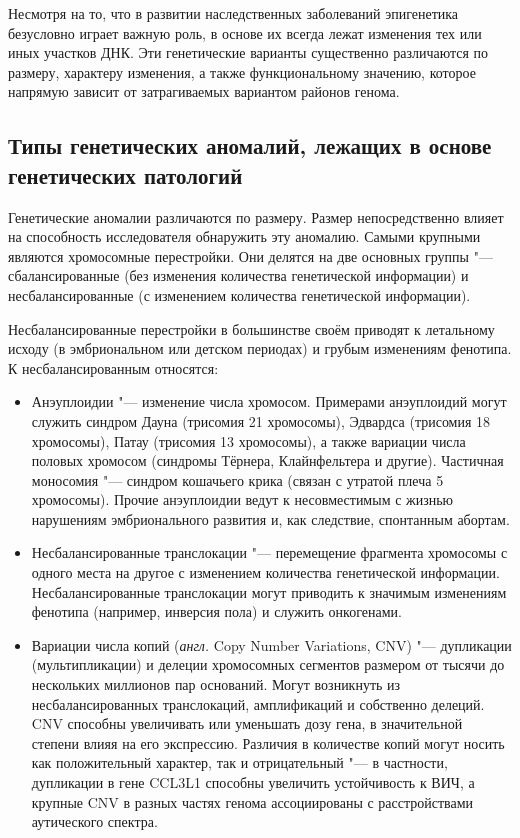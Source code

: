 \documentclass[a4paper,12pt]{article}
\begin{document}
Несмотря на то, что в развитии наследственных заболеваний эпигенетика безусловно играет важную роль, в основе их всегда лежат изменения тех или иных участков ДНК.
Эти генетические варианты существенно различаются по размеру, характеру изменения, а также функциональному значению, которое напрямую зависит от затрагиваемых вариантом районов генома.

\subsection{Типы генетических аномалий, лежащих в основе генетических патологий}

Генетические аномалии различаются по размеру.
Размер непосредственно влияет на способность исследователя обнаружить эту аномалию.
Самыми крупными являются хромосомные перестройки.
Они делятся на две основных группы "--- сбалансированные (без изменения количества генетической информации) и несбалансированные (с изменением количества генетической информации).

Несбалансированные перестройки в большинстве своём приводят к летальному исходу (в эмбриональном или детском периодах) и грубым изменениям фенотипа.
К несбалансированным относятся:

\begin{itemize}
\item Анэуплоидии "--- изменение числа хромосом.
Примерами анэуплоидий могут служить синдром Дауна (трисомия 21 хромосомы), Эдвардса (трисомия 18 хромосомы), Патау (трисомия 13 хромосомы), а также вариации числа половых хромосом (синдромы Тёрнера, Клайнфельтера и другие).
Частичная моносомия "--- синдром кошачьего крика (связан с утратой плеча 5 хромосомы).
Прочие анэуплоидии ведут к несовместимым с жизнью нарушениям эмбрионального развития и, как следствие, спонтанным абортам.
\item Несбалансированные транслокации "--- перемещение фрагмента хромосомы с одного места на другое с изменением количества генетической информации.
Несбалансированные транслокации могут приводить к значимым изменениям фенотипа (например, инверсия пола\cite{Rizvi_2008}) и служить онкогенами\cite{O_Connor_2008}.
\item Вариации числа копий (\textit{англ.} Copy Number Variations, CNV) "--- дупликации (мультипликации) и делеции хромосомных сегментов размером от тысячи до нескольких миллионов пар оснований.
Могут возникнуть из несбалансированных транслокаций, амплификаций и собственно делеций.
CNV способны увеличивать или уменьшать дозу гена, в значительной степени влияя на его экспрессию.
Различия в количестве копий могут носить как положительный характер, так и отрицательный "--- в частности, дупликации в гене CCL3L1 способны увеличить устойчивость к ВИЧ\cite{Gonzalez_2005}, а крупные CNV в разных частях генома ассоциированы с расстройствами аутического спектра\cite{Sebat_2007}.
\end{itemize}
\end{document}
